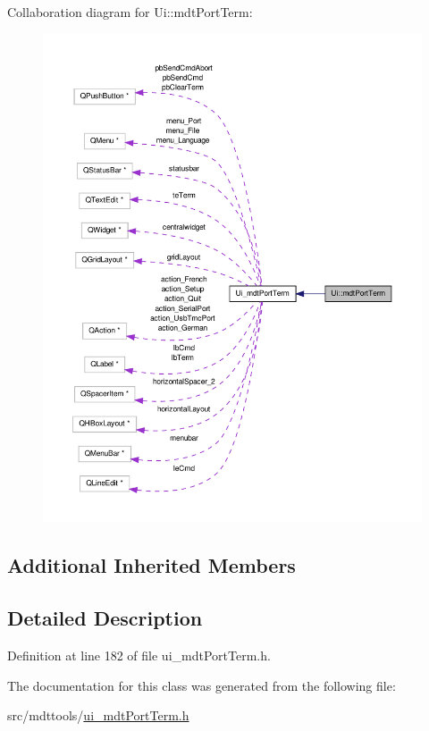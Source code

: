 Collaboration diagram for Ui\-:\-:mdt\-Port\-Term\-:
\nopagebreak
\begin{figure}[H]
\begin{center}
\leavevmode
\includegraphics[width=350pt]{class_ui_1_1mdt_port_term__coll__graph}
\end{center}
\end{figure}
\subsection*{Additional Inherited Members}


\subsection{Detailed Description}


Definition at line 182 of file ui\-\_\-mdt\-Port\-Term.\-h.



The documentation for this class was generated from the following file\-:\begin{DoxyCompactItemize}
\item 
src/mdttools/\hyperlink{ui__mdt_port_term_8h}{ui\-\_\-mdt\-Port\-Term.\-h}\end{DoxyCompactItemize}
